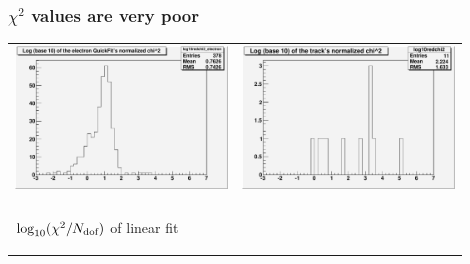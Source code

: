 \documentclass[12pt,compress]{beamer}
\begin{document}
\begin{frame}
\frametitle{$\chi^2$ values are very poor}
\begin{center}
\begin{tabular}{p{0.45\linewidth} p{0.45\linewidth}}
\begin{minipage}{\linewidth}
\includegraphics[width=\linewidth]{log10redchi2_electron}
\end{minipage} &
\begin{minipage}{\linewidth}
\includegraphics[width=\linewidth]{log10redchi2}
\end{minipage} \\
& \\
\begin{minipage}{\linewidth}
\begin{center}
$\log_{10}(\chi^2/N_{\mbox{\scriptsize dof}})$ of linear fit
\end{center}

\end{minipage}
\end{tabular}
\end{center}
\end{frame}
\end{document}
